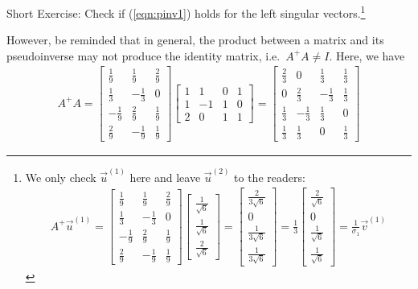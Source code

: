 Short Exercise: Check if (\ref{eqn:pinv1}) holds for the left singular vectors.\footnote{We only check $\vec{u}^{(1)}$ here and leave $\vec{u}^{(2)}$ to the readers:
\begin{align*}
A^+\vec{u}^{(1)} = \begin{bmatrix}
\frac{1}{9}&\frac{1}{9}&\frac{2}{9}\\ 
\frac{1}{3}&-\frac{1}{3}&0\\ 
-\frac{1}{9}&\frac{2}{9}&\frac{1}{9}\\ 
\frac{2}{9}&-\frac{1}{9}&\frac{1}{9}
\end{bmatrix}
\begin{bmatrix}
\frac{1}{\sqrt{6}}\\ 
\frac{1}{\sqrt{6}}\\ 
\frac{2}{\sqrt{6}}    
\end{bmatrix}
=
\begin{bmatrix}
\frac{2}{3\sqrt{6}}\\ 
0\\ 
\frac{1}{3\sqrt{6}}\\ 
\frac{1}{3\sqrt{6}}
\end{bmatrix}
= \frac{1}{3}
\begin{bmatrix}
\frac{2}{\sqrt{6}}\\ 
0\\ 
\frac{1}{\sqrt{6}}\\ 
\frac{1}{\sqrt{6}}
\end{bmatrix}
= \frac{1}{\sigma_1}\vec{v}^{(1)}
\end{align*}}\par
However, be reminded that in general, the product between a matrix and its pseudoinverse may not produce the identity matrix, i.e.\ $A^+ A \neq I$. Here, we have
\begin{align*}
A^+ A = 
\begin{bmatrix}
\frac{1}{9}&\frac{1}{9}&\frac{2}{9}\\ 
\frac{1}{3}&-\frac{1}{3}&0\\ 
-\frac{1}{9}&\frac{2}{9}&\frac{1}{9}\\ 
\frac{2}{9}&-\frac{1}{9}&\frac{1}{9}
\end{bmatrix}  
\begin{bmatrix}
1&1&0&1\\ 
1&-1&1&0\\ 
2&0&1&1
\end{bmatrix}
=
\begin{bmatrix}
\frac{2}{3}&0&\frac{1}{3}&\frac{1}{3}\\ 
0&\frac{2}{3}&-\frac{1}{3}&\frac{1}{3}\\ 
\frac{1}{3}&-\frac{1}{3}&\frac{1}{3}&0\\ 
\frac{1}{3}&\frac{1}{3}&0&\frac{1}{3}
\end{bmatrix}
\end{align*}

